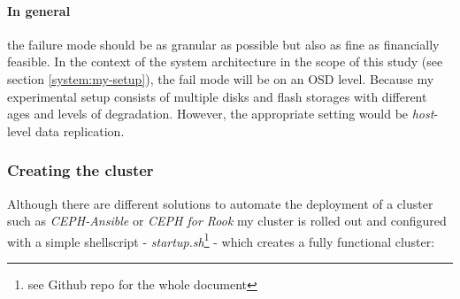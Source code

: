 \documentclass[titlepage, a4paper, 11pt]{scrartcl}
\begin{document}
                \paragraph{In general} the failure mode should be as granular as possible but also as fine as financially feasible.
                In the context of the system architecture in the scope of this study (see section \ref{system:my-setup}), the fail mode will be on an OSD level.
                Because my experimental setup consists of multiple disks and flash storages with different ages and levels of degradation.
                However, the appropriate setting would be \textit{host}-level data replication.

            \subsubsection{Creating the cluster}

                Although there are different solutions to automate the deployment of a cluster such as \textit{CEPH-Ansible}\cite{cephansible} or \textit{CEPH for Rook}\cite{RookDocs} my cluster is rolled out and configured with a simple shellscript - \textit{startup.sh}\footnote{see Github repo for the whole document} - which creates a fully functional cluster:
\end{document}
